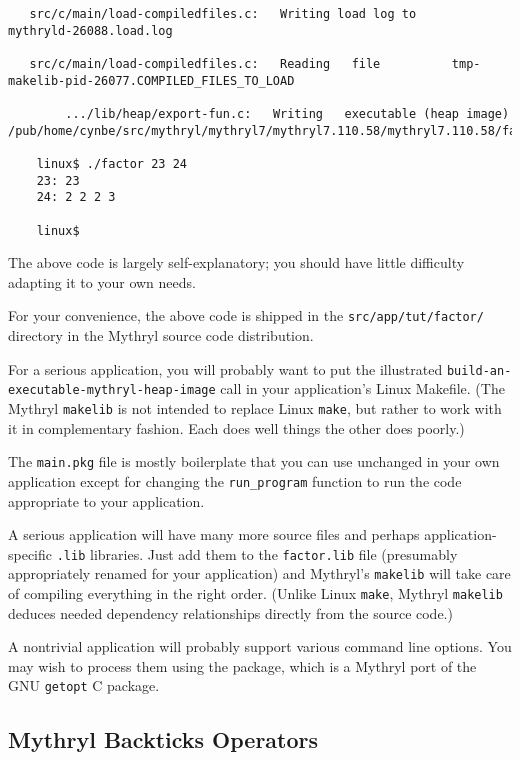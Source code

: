 \begin{verbatim}
   src/c/main/load-compiledfiles.c:   Writing load log to               mythryld-26088.load.log

   src/c/main/load-compiledfiles.c:   Reading   file          tmp-makelib-pid-26077.COMPILED_FILES_TO_LOAD

        .../lib/heap/export-fun.c:   Writing   executable (heap image) /pub/home/cynbe/src/mythryl/mythryl7/mythryl7.110.58/mythryl7.110.58/factor

    linux$ ./factor 23 24
    23: 23
    24: 2 2 2 3

    linux$
\end{verbatim}

The above code is largely self-explanatory;  you should have little difficulty 
adapting it to your own needs.

For your convenience, the above code is shipped in the 
{\tt src/app/tut/factor/} directory in the Mythryl source 
code distribution.

For a serious application, you will probably want to put the 
illustrated {\tt build-an-executable-mythryl-heap-image} call 
in your application's Linux Makefile.  (The Mythryl {\tt makelib} 
is not intended to replace Linux {\tt make}, but rather to 
work with it in complementary fashion.  Each does well things 
the other does poorly.)

The {\tt main.pkg} file is mostly boilerplate that you can use 
unchanged in your own application except for changing the 
{\tt run\_program} function to run the code appropriate to your 
application.

A serious application will have many more source files and perhaps 
application-specific {\tt .lib} libraries.  Just add them to the 
{\tt factor.lib} file (presumably appropriately renamed for your 
application) and Mythryl's {\tt makelib} will take care of compiling 
everything in the right order.  (Unlike Linux {\tt make}, Mythryl 
{\tt makelib} deduces needed dependency relationships directly 
from the source code.)

A nontrivial application will probably support various command line 
options.  You may wish to process them using the 
 package, 
which is a Mythryl port of the {\sc GNU} {\tt getopt} C package.



\cutend*

\subsection{Mythryl Backticks Operators}

